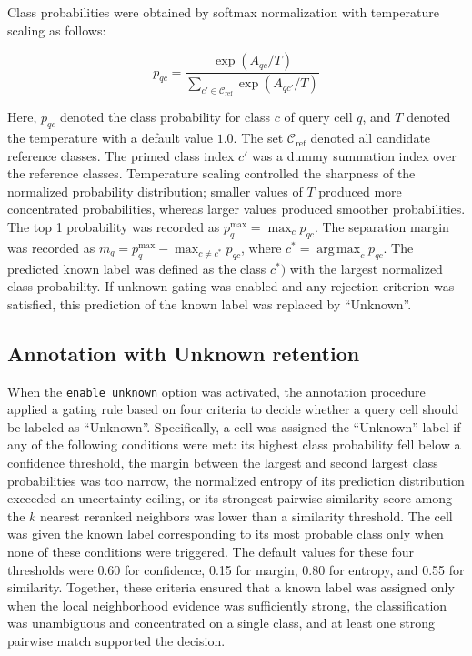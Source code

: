 \documentclass[11pt]{article}
\begin{document}
Class probabilities were obtained by softmax normalization with temperature scaling as follows:

\begin{equation}
p_{qc}=
\frac{
\exp(A_{qc}/T)
}
{
\sum_{c'\in\mathcal{C}_{\mathrm{ref}}}
\exp(A_{qc'}/T)
}
  \label{eq:p}
\end{equation}

Here, \(p_{qc}\) denoted the class probability for class \(c\) of query cell \(q\), and \(T\) denoted the temperature with a default value $1.0$. The set \(\mathcal{C}_{\mathrm{ref}}\) denoted all candidate reference classes. The primed class index \(c'\) was a dummy summation index over the reference classes. Temperature scaling controlled the sharpness of the normalized probability distribution; smaller values of \(T\) produced more concentrated probabilities, whereas larger values produced smoother probabilities. The top 1 probability was recorded as \(p_q^{\max}=\max_c p_{qc}\). The separation margin was recorded as \(m_q=p_q^{\max}-\max_{c\neq c^*}p_{qc}\), where \(c^*=\operatorname{arg\,max}_c p_{qc}\). The predicted known label was defined as the class \(c^*)\) with the largest normalized class probability. If unknown gating was enabled and any rejection criterion was satisfied, this prediction of the known label was replaced by ``Unknown''.

\subsection*{Annotation with Unknown retention}

When the \texttt{enable\_unknown} option was activated, the annotation procedure applied a gating rule based on four criteria to decide whether a query cell should be labeled as ``Unknown''. Specifically, a cell was assigned the ``Unknown'' label if any of the following conditions were met: its highest class probability fell below a confidence threshold, the margin between the largest and second largest class probabilities was too narrow, the normalized entropy of its prediction distribution exceeded an uncertainty ceiling, or its strongest pairwise similarity score among the $k$ nearest reranked neighbors was lower than a similarity threshold. The cell was given the known label corresponding to its most probable class only when none of these conditions were triggered. The default values for these four thresholds were 0.60 for confidence, 0.15 for margin, 0.80 for entropy, and 0.55 for similarity. Together, these criteria ensured that a known label was assigned only when the local neighborhood evidence was sufficiently strong, the classification was unambiguous and concentrated on a single class, and at least one strong pairwise match supported the decision.
\end{document}
